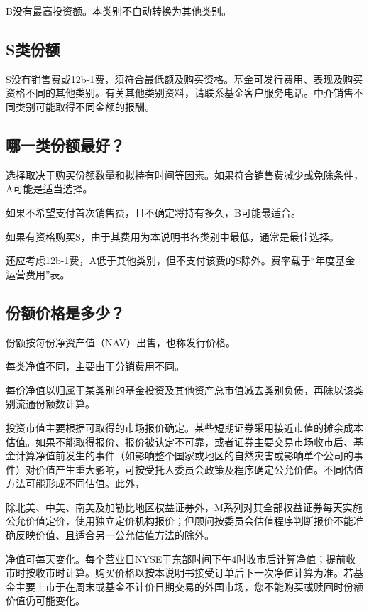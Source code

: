 \documentclass[UTF8,fontset=none,11pt,a4paper]{ctexart}
\begin{document}
B没有最高投资额。本类别不自动转换为\allowbreak\mbox{其他类别。}

\subsection*{S类份额}
S没有销售费或12b-1费，须符合最低额及购买资格。基金可发行费用、表现及购买资格不同的其他类别。有关其他类别资料，请联系基金客户服务电话。中介销售不同类别可能取得不同金额\allowbreak\mbox{的报酬。}

\subsection*{哪一类份额最好？}
选择取决于购买份额数量和拟持有时间等因素。如果符合销售费减少或免除条件，A可能是\allowbreak\mbox{适当选择。}

如果不希望支付首次销售费，且不确定将持有多久，B可\allowbreak\mbox{能最适合。}

如果有资格购买S，由于其费用为本说明书各类别中最低，通常是\allowbreak\mbox{最佳选择。}

还应考虑12b-1费，A低于其他类别，但不支付该费的S除外。费率载于“年度基金运营费用”表。

\subsection*{份额价格是多少？}
份额按每份净资产值（NAV）出售，也称\allowbreak\mbox{发行价格。}

每类净值不同，主要由于分销\allowbreak\mbox{费用不同。}

每份净值以归属于某类别的基金投资及其他资产总市值减去类别负债，再除以该类别流通份\allowbreak\mbox{额数计算。}

投资市值主要根据可取得的市场报价确定。某些短期证券采用接近市值的摊余成本估值。如果不能取得报价、报价被认定不可靠，或者证券主要交易市场收市后、基金计算净值前发生的事件（如影响整个国家或地区的自然灾害或影响单个公司的事件）对价值产生重大影响，可按受托人委员会政策及程序确定公允价值。不同估值方法可能形成不同估值。此外，

除北美、中美、南美及加勒比地区权益证券外，M系列对其全部权益证券每天实施公允价值定价，使用独立定价机构报价；但顾问按委员会估值程序判断报价不能准确反映价值、且适合另一公允估值方\allowbreak\mbox{法的除外。}

净值可每天变化。每个营业日NYSE于东部时间下午4时收市后计算净值；提前收市时按收市时计算。购买价格以按本说明书接受订单后下一次净值计算为准。若基金主要上市于在周末或基金不计价日期交易的外国市场，您不能购买或赎回时份额价值仍\allowbreak\mbox{可能变化。}
\end{document}
